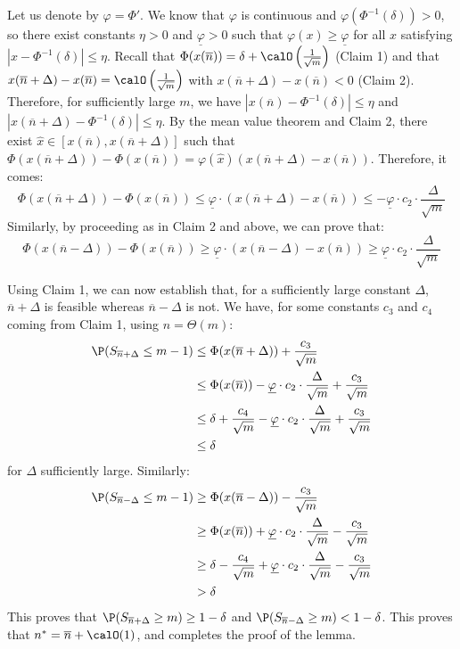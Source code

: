\documentclass[blindrev]{informs3noheader}
\begin{document}
Let us denote by $\varphi=\Phi'$. We know that $\varphi$ is continuous and $\varphi(\Phi^{-1}(\delta))>0$, so there exist constants $\eta>0$ and $\underline{\varphi}>0$ such that $\varphi(x)\geq\underline{\varphi}$ for all $x$ satisfying $|x-\Phi^{-1}(\delta)|\leq\eta$. Recall that $\Phi(x(\overline{n}))=\delta+\calO\left(\frac{1}{\sqrt m}\right)$ (Claim 1) and that $x(\overline{n}+\Delta)-x(\overline{n})=\calO\left(\frac{1}{\sqrt m}\right)$ with $x(\overline{n}+\Delta)-x(\overline{n})<0$ (Claim 2). Therefore, for sufficiently large $m$, we have $|x(\overline{n})-\Phi^{-1}(\delta)|\leq\eta$ and $|x(\overline{n}+\Delta)-\Phi^{-1}(\delta)|\leq\eta$. By the mean value theorem and Claim 2, there exist $\widehat{x}\in[x(\overline{n}),x(\overline{n}+\Delta)]$ such that $\Phi(x(\overline{n}+\Delta))-\Phi(x(\overline{n}))=\varphi(\widehat{x})(x(\overline{n}+\Delta)-x(\overline{n}))$. Therefore, it comes:
$$\Phi(x(\overline{n}+\Delta))-\Phi(x(\overline{n}))\leq\underline{\varphi}\cdot\left(x(\overline{n}+\Delta)-x(\overline{n})\right)\leq-\underline{\varphi}\cdot c_2\cdot\frac{\Delta}{\sqrt m}$$
Similarly, by proceeding as in Claim 2 and above, we can prove that:
$$\Phi(x(\overline{n}-\Delta))-\Phi(x(\overline{n}))\geq\underline{\varphi}\cdot\left(x(\overline{n}-\Delta)-x(\overline{n})\right)\geq\underline{\varphi}\cdot c_2\cdot\frac{\Delta}{\sqrt m}$$

Using Claim 1, we can now establish that, for a sufficiently large constant $\Delta$, $\overline{n}+\Delta$ is feasible whereas $\overline{n}-\Delta$ is not. We have, for some constants $c_3$ and $c_4$ coming from Claim 1, using $n=\Theta(m)$:
\begin{align*}
\P(S_{\overline{n}+\Delta}\leq m-1)
&\leq \Phi(x(\overline{n}+\Delta))+\frac{c_3}{\sqrt m}\\
&\leq \Phi(x(\overline{n}))-\underline{\varphi}\cdot c_2\cdot\frac{\Delta}{\sqrt m}+\frac{c_3}{\sqrt m}\\
&\leq \delta+\frac{c_4}{\sqrt m}-\underline{\varphi}\cdot c_2\cdot\frac{\Delta}{\sqrt m}+\frac{c_3}{\sqrt m}\\
&\leq\delta
\end{align*}
for $\Delta$ sufficiently large. Similarly:
\begin{align*}
\P(S_{\overline{n}-\Delta}\leq m-1)
&\geq \Phi(x(\overline{n}-\Delta))-\frac{c_3}{\sqrt m}\\
&\geq \Phi(x(\overline{n}))+\underline{\varphi}\cdot c_2\cdot\frac{\Delta}{\sqrt m}-\frac{c_3}{\sqrt m}\\
&\geq \delta-\frac{c_4}{\sqrt m}+\underline{\varphi}\cdot c_2\cdot\frac{\Delta}{\sqrt m}-\frac{c_3}{\sqrt m}\\
&>\delta
\end{align*}
This proves that $\P(S_{\overline{n}+\Delta}\geq m)\geq1-\delta$ and $\P(S_{\overline{n}-\Delta}\geq m)<1-\delta$. This proves that $n^*=\overline{n}+\calO(1)$, and completes the proof of the lemma.
\end{document}
